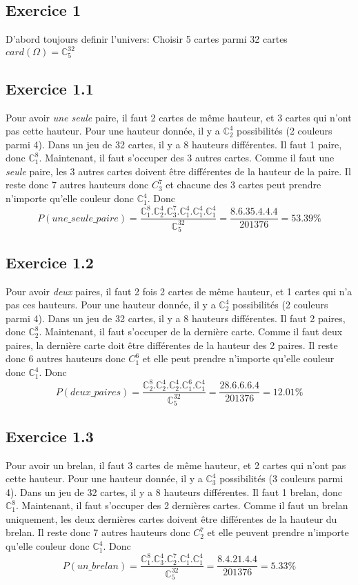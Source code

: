 \documentclass[]{book}
\theoremstyle{definition}
\newcommand{\bb}[1]{\mathbb{#1}}
\newcommand{\C}{\bb{C}}
\begin{document}
\subsection*{Exercice 1}
D'abord toujours definir l'univers: Choisir 5 cartes parmi 32 cartes $card(\Omega)=\C_5^32$

\subsection*{Exercice 1.1}
Pour avoir \emph{une seule} paire, il faut 2 cartes de m\^eme hauteur, et 3 cartes qui n'ont pas cette hauteur. Pour une hauteur donn\'ee, il y a $\C_2^4$ possibilit\'es (2 couleurs parmi 4). Dans un jeu de 32 cartes, il y a 8 hauteurs diff\'erentes. Il faut 1 paire, donc $\C_1^8$. Maintenant, il faut s'occuper des 3 autres cartes. Comme il faut une \emph{seule} paire, les 3 autres cartes doivent \^etre diff\'erentes de la hauteur de la paire. Il reste donc 7 autres hauteurs donc $C_3^7$ et chacune des 3 cartes peut prendre n'importe qu'elle couleur donc $\C_1^4$. Donc
$$P(une\_seule\_paire) = \frac{\C_1^8.\C_2^4.\C_3^7.\C_1^4.\C_1^4.\C_1^4}{\C_5^{32}} = \frac{8.6.35.4.4.4}{201376} = 53.39\%$$

\subsection*{Exercice 1.2}
Pour avoir \emph{deux} paires, il faut 2 fois 2 cartes de m\^eme hauteur, et 1 cartes qui n'a pas ces hauteurs. Pour une hauteur donn\'ee, il y a $\C_2^4$ possibilit\'es (2 couleurs parmi 4). Dans un jeu de 32 cartes, il y a 8 hauteurs diff\'erentes. Il faut 2 paires, donc $\C_2^8$. Maintenant, il faut s'occuper de la derni\`ere carte. Comme il faut deux paires, la derni\`ere carte doit \^etre diff\'erentes de la hauteur des 2 paires. Il reste donc 6 autres hauteurs donc $C_1^6$ et elle peut prendre n'importe qu'elle couleur donc $\C_1^4$. Donc
$$P(deux\_paires) = \frac{\C_2^8.\C_2^4.\C_2^4.\C_1^6.\C_1^4}{\C_5^{32}} = \frac{28.6.6.6.4}{201376} = 12.01\%$$


\subsection*{Exercice 1.3}
Pour avoir un brelan, il faut 3 cartes de m\^eme hauteur, et 2 cartes qui n'ont pas cette hauteur. Pour une hauteur donn\'ee, il y a $\C_3^4$ possibilit\'es (3 couleurs parmi 4). Dans un jeu de 32 cartes, il y a 8 hauteurs diff\'erentes. Il faut 1 brelan, donc $\C_1^8$. Maintenant, il faut s'occuper des 2 derni\`eres cartes. Comme il faut un brelan uniquement, les deux derni\`eres cartes doivent \^etre diff\'erentes de la hauteur du brelan. Il reste donc 7 autres hauteurs donc $C_2^7$ et elle peuvent prendre n'importe qu'elle couleur donc $\C_1^4$. Donc
$$P(un\_brelan) = \frac{\C_1^8.\C_3^4.\C_2^7.\C_1^4.\C_1^4}{\C_5^{32}} = \frac{8.4.21.4.4}{201376} = 5.33\%$$
\end{document}
